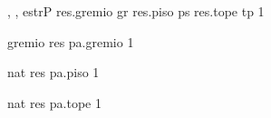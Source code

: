 {, , }{estrP}
{
	\state res.gremio \asig gr										
	\state res.piso \asig ps										
	\state res.tope \asig tp										
}
{1}
{}

{}{gremio}
{
	\state res \asig pa.gremio										
}
{1}
{}

{}{nat}
{
	\state res \asig pa.piso										
}
{1}
{}

{}{nat}
{
	\state res \asig pa.tope										
}
{1}
{}